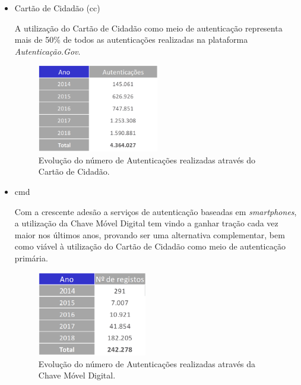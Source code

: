 \begin{itemize}
    \item Cartão de Cidadão (\gls{cc})
    
    A utilização do Cartão de Cidadão como meio de autenticação representa mais de 50\% de todos as autenticações realizadas na plataforma \emph{Autenticação.Gov}.
    
    \begin{figure}[h]
        \centering
        \includegraphics[width=0.5\textwidth]{img/authgov/authCC.png}
        \caption{Evolução do número de Autenticações realizadas através do Cartão de Cidadão.\cite{authGovStats}}
    \end{figure}
    
    \item \gls{cmd}
    
    Com a crescente adesão a serviços de autenticação baseadas em \emph{smartphones}, a utilização da Chave Móvel Digital tem vindo a ganhar tração cada vez maior nos últimos anos, provando ser uma alternativa complementar, bem como viável à utilização do Cartão de Cidadão como meio de autenticação primária.
    
    \begin{figure}[h]
        \centering
        \includegraphics[width=0.45\textwidth]{img/authgov/authCMD.png}
        \caption{Evolução do número de Autenticações realizadas através da Chave Móvel Digital.\cite{authGovStats}}
    \end{figure}
\end{itemize}

